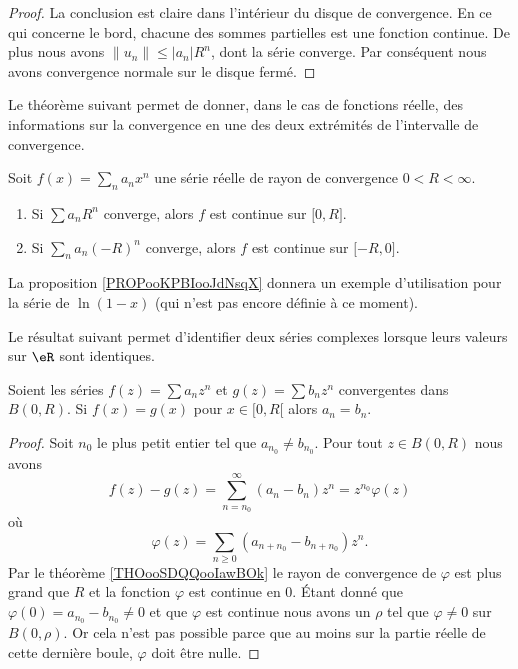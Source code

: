 \begin{proof}
	La conclusion est claire dans l'intérieur du disque de convergence. En ce qui concerne le bord, chacune des sommes partielles est une fonction continue. De plus nous avons \( \| u_n \|\leq | a_n |R^n\), dont la série converge. Par conséquent nous avons convergence normale sur le disque fermé.
\end{proof}

Le théorème suivant permet de donner, dans le cas de fonctions réelle, des informations sur la convergence en une des deux extrémités de l'intervalle de convergence.
\begin{theorem} \label{ThoLUXVjs}
	Soit \( f(x)=\sum_na_nx^n\) une série réelle de rayon de convergence \( 0<R<\infty\).
	\begin{enumerate}
		\item
		      Si \( \sum a_nR^n\) converge, alors \( f\) est continue sur \( \mathopen[ 0 , R \mathclose]\).
		\item
		      Si \( \sum_na_n(-R)^n\) converge, alors \( f\) est continue sur \( \mathopen[ -R , 0 \mathclose]\).
	\end{enumerate}
\end{theorem}

La proposition \ref{PROPooKPBIooJdNsqX} donnera un exemple d'utilisation pour la série de \( \ln(1-x)\) (qui n'est pas encore définie à ce moment).


Le résultat suivant permet d'identifier deux séries complexes lorsque leurs valeurs sur \( \eR\) sont identiques.
\begin{proposition}
	Soient les séries \( f(z)=\sum a_nz^n\) et \( g(z)=\sum b_n z^n\) convergentes dans \( B(0,R)\). Si \( f(x)=g(x)\) pour \( x\in \mathopen[ 0 , R [\) alors \( a_n=b_n\).
\end{proposition}

\begin{proof}
	Soit \( n_0\) le plus petit entier tel que \( a_{n_0}\neq b_{n_0}\). Pour tout \( z\in B(0,R)\) nous avons
	\begin{equation}
		f(z)-g(z)=\sum_{n=n_0}^{\infty}(a_n-b_n)z^n=z^{n_0}\varphi(z)
	\end{equation}
	où
	\begin{equation}
		\varphi(z)=\sum_{n\geq 0}(a_{n+n_0}-b_{n+n_0})z^n.
	\end{equation}
	Par le théorème \ref{THOooSDQQooIawBOk} le rayon de convergence de \( \varphi\) est plus grand que \( R\) et la fonction \( \varphi\) est continue en \( 0\). Étant donné que \( \varphi(0)=a_{n_0}-b_{n_0}\neq 0\) et que \( \varphi\) est continue nous avons un \( \rho\) tel que \( \varphi\neq 0\) sur \( B(0,\rho)\). Or cela n'est pas possible parce que au moins sur la partie réelle de cette dernière boule, \( \varphi\) doit être nulle.
\end{proof}

